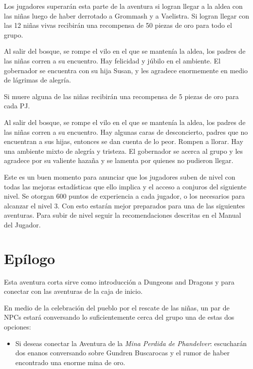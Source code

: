 \documentclass[10pt,twoside,twocolumn,openany]{dndbook}
\begin{document}
Los jugadores superarán esta parte de la aventura si logran llegar a la aldea con las niñas 
luego de haber derrotado a Grommash y a Vaelistra. Si logran llegar con las 12 niñas vivas 
recibirán una recompensa de 50 piezas de oro para todo el grupo. 

\begin{DndReadAloud}
  Al salir del bosque, se rompe el vilo en el que se mantenía la aldea, los padres de las niñas 
  corren a su encuentro. Hay felicidad y júbilo en el ambiente. El gobernador se encuentra con su 
  hija Susan, y les agradece enormemente en medio de lágrimas de alegría.
\end{DndReadAloud}

Si muere alguna de las niñas recibirán una recompensa de 5 piezas de oro para cada PJ.

\begin{DndReadAloud}
  Al salir del bosque, se rompe el vilo en el que se mantenía la aldea, los padres de las niñas 
  corren a su encuentro. Hay algunas caras de desconcierto, padres que no encuentran a sus hijas,
  entonces se dan cuenta de lo peor. Rompen a llorar. Hay una ambiente mixto de alegría y 
  tristeza. El gobernador se acerca al grupo y les agradece por su valiente hazaña y se lamenta
  por quienes no pudieron llegar.
\end{DndReadAloud}

Este es un buen momento para anunciar que los jugadores suben de nivel con todas las mejoras 
estadísticas que ello implica y el acceso a conjuros del siguiente nivel. Se otorgan 600 puntos 
de experiencia a cada jugador, o los necesarios para alcanzar el nivel 3. Con esto estarán mejor 
preparados para una de las siguientes aventuras. Para subir de nivel seguir la recomendaciones
descritas en el Manual del Jugador.

\section{Epílogo}

Esta aventura corta sirve como introducción a Dungeons and Dragons y para conectar con las 
aventuras de la caja de inicio.

En medio de la celebración del pueblo por el rescate de las niñas, un par de NPCs estará conversando
lo suficientemente cerca del grupo una de estas dos opciones:

\begin{itemize}
  \item Si deseas conectar la Aventura de la \emph{Mina Perdida de Phandelver}: escucharán dos 
  enanos conversando sobre Gundren Buscarocas y el rumor de haber encontrado una enorme mina de 
  oro.
\end{itemize}
\end{document}
